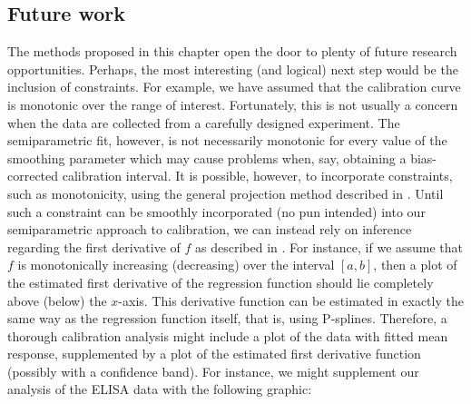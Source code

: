 \documentclass[cmfont,usenames,dvipsnames,leqno]{afit-etd}\usepackage[]{graphicx}\usepackage[]{color}
\begin{document}
\subsection{Future work}
The methods proposed in this chapter open the door to plenty of future research opportunities. Perhaps, the most interesting (and logical) next step would be the inclusion of constraints. For example, we have assumed that the calibration curve is monotonic over the range of interest. Fortunately, this is not usually a concern when the data are collected from a carefully designed experiment. The semiparametric fit, however, is not necessarily monotonic for every value of the smoothing parameter which may cause problems when, say, obtaining a bias-corrected calibration interval. It is possible, however, to incorporate constraints, such as monotonicity, using the general projection method described in \citet{mammen_general_2001}. Until such a constraint can be smoothly incorporated (no pun intended) into our semiparametric approach to calibration, we can instead rely on inference regarding the first derivative of $f$ as described in \citet[pp. 151-156]{ruppert_semiparametric_2003}. For instance, if we assume that $f$ is monotonically increasing (decreasing) over the interval $[a, b]$, then a plot of the estimated first derivative of the regression function should lie completely above (below) the $x$-axis. This derivative function can be estimated in exactly the same way as the regression function itself, that is, using \ac{P-spline}s. Therefore, a thorough calibration analysis might include a plot of the data with fitted mean response, supplemented by a plot of the estimated first derivative function (possibly with a confidence band). For instance, we might supplement our analysis of the ELISA data with the following graphic:
\end{document}
